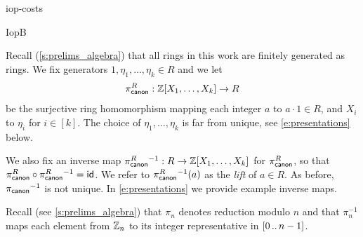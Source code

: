 \begin{lncsappendix}{iop-costs}
\begin{lncsmove}{IopB}
\iflncs
\else
\fi

%




\bigskip

 \noindent Recall (\cref{s:prelims_algebra}) that all rings in this work are finitely generated as rings. We fix generators $1, \eta_1, \ldots, \eta_{k}\in R$ and we let
%
$$
\pi_{\mathsf{canon}}^{R} : \mathbb{Z}[X_1,\ldots, X_{k}] \to R
$$
be the surjective ring homomorphism mapping each integer $a$ to $a\cdot 1\in R$, and  $X_i$ to $\eta_{i}$ for $i\in [k]$. The choice of $\eta_1,\ldots, \eta_k$ is far from unique, see \cref{e:presentations} below. 

We also fix an inverse map  $\pi_{\mathsf{canon}}^{R}{}^{-1}: R \to \mathbb{Z}[X_1, \ldots, X_{k}]$ for $\pi_{\mathsf{canon}}^{R}$, so that $\pi_{\mathsf{canon}}^{R}\circ \pi_{\mathsf{canon}}^{R}{}^{-1}=\mathsf{id}$. We refer to $\pi_{\mathsf{canon}}^{R}{}^{-1}(a)$ as the \emph{lift} of $a\in R$. As before, $\pi_{\mathsf{canon}}{}^{-1}$ is not unique.  In  \cref{e:presentations}  we provide example inverse maps.  

\iflncs \else
Recall (see \cref{s:prelims_algebra}) that $\pi_n$ denotes reduction modulo $n$ and that $\pi_n^{-1}$ maps each element from $\mathbb{Z}_n$ to its integer representative in $[0 \, .. \, n-1]$.
\fi





\end{lncsmove}
\end{lncsappendix}
